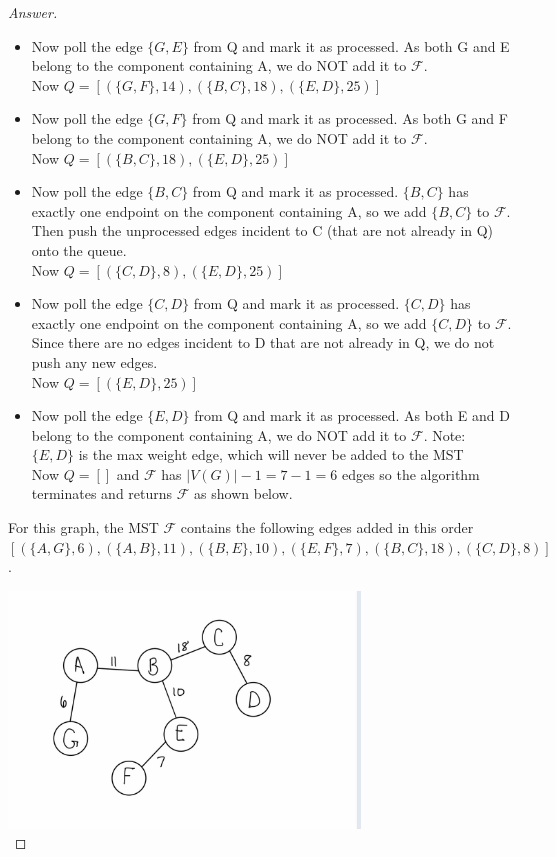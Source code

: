 \documentclass[11pt]{article}
\theoremstyle{definition}
\theoremstyle{definition}
\theoremstyle{definition}
\begin{document}
\begin{proof}[Answer]
\begin{itemize}
\item Now poll the edge $\{G,E\}$ from Q and mark it as processed. As both G and E belong to the component containing A, we do NOT add it to $\mathcal{F}$.\\
Now $Q= [ (\{G,F\}, 14), (\{B,C\}, 18), (\{E,D\}, 25)]$ 
\item Now poll the edge $\{G,F\}$ from Q and mark it as processed. As both G and F belong to the component containing A, we do NOT add it to $\mathcal{F}$.\\
Now $Q= [ (\{B,C\}, 18), (\{E,D\}, 25)]$ 
\item Now poll the edge $\{B,C\}$ from Q and mark it as processed. $\{B,C\}$ has exactly one endpoint on the component containing A, so we add $\{B,C\}$ to $\mathcal{F}$. Then push the unprocessed edges incident to C (that are not already in Q) onto the queue. \\
Now $Q= [ (\{C,D\}, 8), (\{E,D\}, 25)]$ 
\item Now poll the edge $\{C,D\}$ from Q and mark it as processed. $\{C,D\}$ has exactly one endpoint on the component containing A, so we add $\{C,D\}$ to $\mathcal{F}$. Since there are no edges incident to D that are not already in Q, we do not push any new edges. \\
Now $Q= [ (\{E,D\}, 25)]$ 
\item Now poll the edge $\{E,D\}$ from Q and mark it as processed. As both E and D belong to the component containing A, we do NOT add it to $\mathcal{F}$. Note: $\{E,D\}$ is the max weight edge, which will never be added to the MST \\
Now $Q= []$ and $\mathcal{F}$ has $|V(G)|-1 = 7-1= 6$ edges so the algorithm terminates and returns $\mathcal{F}$ as shown below. 
\end{itemize}
For this graph, the MST $\mathcal{F}$ contains the following edges added in this order \\
$ [(\{A,G\}, 6), (\{A,B\}, 11), (\{B,E\}, 10), (\{E,F\}, 7), (\{B,C\}, 18), (\{C,D\}, 8)]$. 

\includegraphics[width=0.7\textwidth]{hw3problem34} \\


\end{proof}
\end{document}
